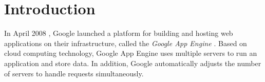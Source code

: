 \section{Introduction}
\label{introduction}
In April 2008 \cite{app-engine-intro}, Google launched a platform for building
and hosting web applications on their infrastructure, called the \emph{Google App
Engine} \cite{app-engine-www}. Based on cloud computing technology, Google App
Engine uses multiple servers to run an application and store data. In addition,
Google automatically adjusts the number of servers to handle requests
simultaneously.
